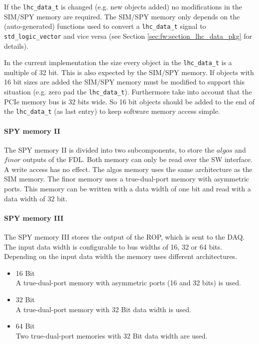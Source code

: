 If the \texttt{lhc\_data\_t} is changed (e.g. new objects added) no modifications in the SIM/SPY memory are required. The SIM/SPY memory only depends on the (auto-generated)
functions used to convert a \texttt{lhc\_data\_t} signal to \texttt{std\_logic\_vector} and vice versa (see Section \ref{sec:fw:section_lhc_data_pkg} for details).

In the current implementation the size every object in the \texttt{lhc\_data\_t} is a multiple of 32 bit. This is also expected by the SIM/SPY memory. If objects with 16 bit sizes
are added the SIM/SPY memory must be modified to support this situation (e.g. zero pad the \texttt{lhc\_data\_t}). Furthermore take into account that the PCIe memory bus is 32 bits wide.
So 16 bit objects should be added to the end of the \texttt{lhc\_data\_t} (as last entry) to keep software memory access simple.

\paragraph{SPY memory II}
The SPY memory II is divided into two subcomponents, to store the $algos$ and $finor$ outputs of the FDL.
Both memory can only be read over the SW interface. A write access has no effect.
The algos memory uses the same architecture as the SIM memory.
The finor memory uses a true-dual-port memory with asymmetric ports. This memory can be written with a data width of one bit and read with a data width of 32 bit.

%
\paragraph{SPY memory III}
The SPY memory III stores the output of the ROP, which is sent to the DAQ. The input data width is configurable to bus widths of 16, 32 or 64 bits.
Depending on the input data width the memory uses different architectures.
\begin{itemize}
\item 16 Bit \\
A true-dual-port memory with asymmetric ports (16 and 32 bits) is used.
\item 32 Bit \\
A true-dual-port memory with 32 Bit data width is used.
\item 64 Bit \\
Two true-dual-port memories with 32 Bit data width are used.
\end{itemize}

